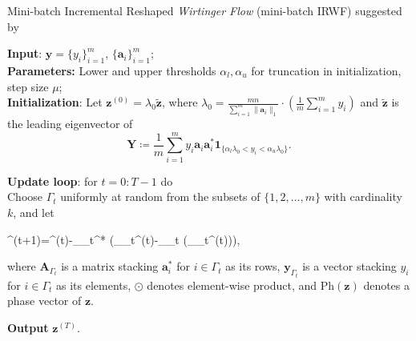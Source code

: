 		\begin{algorithm}[th]
			\caption{Mini-batch Incremental Reshaped \emph{Wirtinger Flow} (mini-batch IRWF) suggested by \cite{reshaped_and_incrementally_reshaped_wirtinger_flow}}\label{alg:mbirwf}
			
			\textbf{Input}: $\boldsymbol{y}=\{y_i\}_{i=1}^m$, $\{\boldsymbol{a}_i\}_{i=1}^m$; \\
			\textbf{Parameters:}  Lower and upper thresholds $\alpha_l,\alpha_u$ for  truncation in initialization, step size $\mu$;\\
			\textbf{Initialization}: Let $\boldsymbol{z}^{(0)}=\lambda_0 \tilde{\boldsymbol{z}}$, where $\lambda_0=\frac{mn}{\sum_{i=1}^m \|\boldsymbol{a}_i\|_1}\cdot \left(\frac{1}{m}\sum_{i=1}^m y_i\right)$ and $\tilde{\boldsymbol{z}}$ is the leading eigenvector of
			\begin{equation}
				\boldsymbol{Y} \coloneqq \frac{1}{m}\sum_{i=1}^m y_i\boldsymbol{a}_i \boldsymbol{a}_i^*\boldsymbol{1}_{\{\alpha_l \lambda_0<y_i< \alpha_u \lambda_0\}}.
			\end{equation}
			
			 \textbf{Update loop}: for $t=0:T-1$ do\\
			 Choose $\Gamma_t$ uniformly at random from the subsets of  $\{1,2,\ldots, m\}$ with cardinality $k$, and let
			 \begin{flalign}
				\boldsymbol{z}^{(t+1)}=^{(t)}-\mu\cdot{}_{\Gamma_t}^* \left(_{\Gamma_t}^{(t)}-_{\Gamma_t}\odot{} (_{\Gamma_t}^{(t)})\right), \label{eq:mbirwfUpdate}
			\end{flalign}
			where $\boldsymbol{A}_{\Gamma_t}$ is a matrix stacking $\boldsymbol{a}_i^*$ for $i\in \Gamma_t$ as its rows,  $\boldsymbol{y}_{\Gamma_t}$ is a vector stacking $y_i$ for $i\in \Gamma_t$ as its elements, $\odot$ denotes element-wise product, and $\text{Ph}(\boldsymbol{z})$ denotes a phase vector of $\boldsymbol{z}$.%
			
			\textbf{Output} $\boldsymbol{z}^{(T)}$.
			\end{algorithm}


			